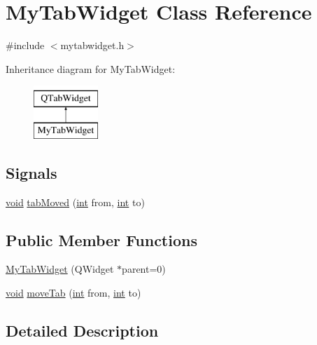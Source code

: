 \hypertarget{class_my_tab_widget}{\section{My\-Tab\-Widget Class Reference}
\label{class_my_tab_widget}
}


{\ttfamily \#include $<$mytabwidget.\-h$>$}

Inheritance diagram for My\-Tab\-Widget\-:\begin{figure}[H]
\begin{center}
\leavevmode
\includegraphics[height=2.000000cm]{class_my_tab_widget}
\end{center}
\end{figure}
\subsection*{Signals}
\begin{DoxyCompactItemize}
\item 
\hyperlink{group___u_a_v_objects_plugin_ga444cf2ff3f0ecbe028adce838d373f5c}{void} \hyperlink{class_my_tab_widget_a3cad1d52a2543be31fe243ef7781c43b}{tab\-Moved} (\hyperlink{ioapi_8h_a787fa3cf048117ba7123753c1e74fcd6}{int} from, \hyperlink{ioapi_8h_a787fa3cf048117ba7123753c1e74fcd6}{int} to)
\end{DoxyCompactItemize}
\subsection*{Public Member Functions}
\begin{DoxyCompactItemize}
\item 
\hyperlink{class_my_tab_widget_a5527dac8c6c4b4915555cb72d77b93ba}{My\-Tab\-Widget} (Q\-Widget $\ast$parent=0)
\item 
\hyperlink{group___u_a_v_objects_plugin_ga444cf2ff3f0ecbe028adce838d373f5c}{void} \hyperlink{class_my_tab_widget_ac15c5b84dc2e5338b7a86507ff402980}{move\-Tab} (\hyperlink{ioapi_8h_a787fa3cf048117ba7123753c1e74fcd6}{int} from, \hyperlink{ioapi_8h_a787fa3cf048117ba7123753c1e74fcd6}{int} to)
\end{DoxyCompactItemize}


\subsection{Detailed Description}


